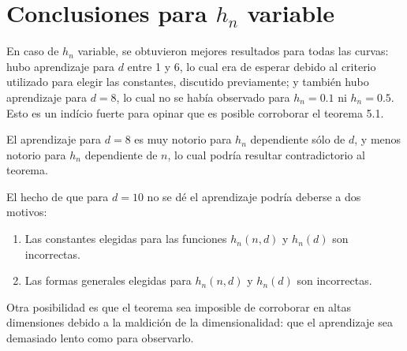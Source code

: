 \documentclass[12pt, a4paper]{article}
\begin{document}
\section{Conclusiones para $h_n$ variable}

En caso de $h_n$ variable, se obtuvieron mejores resultados para todas las curvas: hubo aprendizaje para $d$ entre 1 y 6, lo cual era de esperar debido al criterio utilizado para elegir las constantes, discutido previamente; y también hubo aprendizaje para $d=8$, lo cual no se había observado para $h_n=0.1$ ni $h_n=0.5$. Esto es un indício fuerte para opinar que es posible corroborar el teorema 5.1.

El aprendizaje para $d=8$ es muy notorio para $h_n$ dependiente sólo de $d$, y menos notorio para $h_n$ dependiente de $n$, lo cual podría resultar contradictorio al teorema.

El hecho de que para $d=10$ no se dé el aprendizaje podría deberse a dos motivos:
\begin{enumerate}
  \item Las constantes elegidas para las funciones $h_n(n,d)$ y $h_n(d)$ son incorrectas.
  \item Las formas generales elegidas para $h_n(n,d)$ y $h_n(d)$ son incorrectas.
\end{enumerate}

Otra posibilidad es que el teorema sea imposible de corroborar en altas dimensiones debido a la maldición de la dimensionalidad: que el aprendizaje sea demasiado lento como para observarlo.
\end{document}
